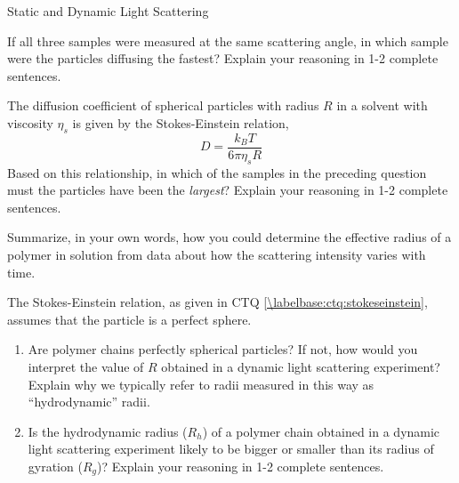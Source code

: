 \begin{activity}{Static and Dynamic Light Scattering}
\begin{ctqs}
		If all three samples were measured at the same scattering angle, in which sample were the particles diffusing the fastest?  Explain your reasoning in 1-2 complete sentences.
	
		\begin{solution}[1.25in]
		\end{solution}
	
	\question The diffusion coefficient of spherical particles with radius $R$ in a solvent with viscosity $\eta_s$ is given by the Stokes-Einstein relation,
	\begin{equation*}
		D = \frac{ k_B T}{6\pi \eta_s R}
	\end{equation*}
	Based on this relationship, in which of the samples in the preceding question must the particles have been the \emph{largest}?  Explain your reasoning in 1-2 complete sentences. \label{\labelbase:ctq:stokeseinstein}
	
		\begin{solution}[1.25in]
		\end{solution}
	
	\question Summarize, in your own words, how you could determine the effective radius of a polymer in solution from data about how the scattering intensity varies with time.
	
		\begin{solution}[1.5in]
		\end{solution}

\end{ctqs}



\begin{exercises}

	\exercise The Stokes-Einstein relation, as given in CTQ \ref{\labelbase:ctq:stokeseinstein}, assumes that the particle is a perfect sphere.
	
		\begin{enumerate}
		
			\item Are polymer chains perfectly spherical particles?  If not, how would you interpret the value of $R$ obtained in a dynamic light scattering experiment?  Explain why we typically refer to radii measured in this way as ``hydrodynamic'' radii.
			
			\item Is the hydrodynamic radius ($R_h$) of a polymer chain obtained in a dynamic light scattering experiment likely to be bigger or smaller than its radius of gyration ($R_g$)?  Explain your reasoning in 1-2 complete sentences.
			
		\end{enumerate}
	
\end{exercises}


%
%	


	
\end{activity}